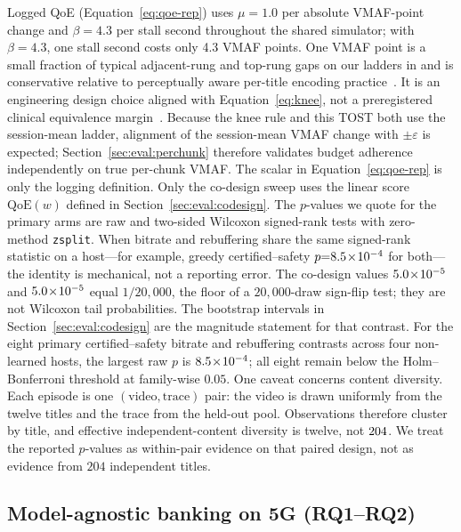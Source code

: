 Logged QoE (Equation~\eqref{eq:qoe-rep}) uses \(\mu{=}1.0\) per absolute VMAF-point change and \(\beta{=}4.3\) per stall second throughout the shared simulator; with \(\beta{=}4.3\), one stall second costs only 4.3 VMAF points.
One VMAF point is a small fraction of typical adjacent-rung and top-rung gaps on our ladders in  and is conservative relative to perceptually aware per-title encoding practice~\cite{menon2022perceptual}. It is an engineering design choice aligned with Equation~\eqref{eq:knee}, not a preregistered clinical equivalence margin~\cite{lakens2017equivalence}. Because the knee rule and this TOST both use the session-mean ladder, alignment of the session-mean VMAF change with \(\pm\varepsilon\) is expected; Section~\ref{sec:eval:perchunk} therefore validates budget adherence independently on true per-chunk VMAF.
The scalar in Equation~\eqref{eq:qoe-rep} is only the logging definition. Only the co-design sweep uses the linear score \(\mathrm{QoE}(w)\) defined in Section~\ref{sec:eval:codesign}.
The \(p\)-values we quote for the primary arms are raw and two-sided Wilcoxon signed-rank tests with zero-method \texttt{zsplit}.
When bitrate and rebuffering share the same signed-rank statistic on a host---for example, greedy certified--safety \(p{=}8.5\!\times\!10^{-4}\) for both---the identity is mechanical, not a reporting error.
The co-design values \(5.0\!\times\!10^{-5}\) and \(5.0\!\times\!10^{-5}\) equal \(1/20{,}000\), the floor of a \(20{,}000\)-draw sign-flip test; they are not Wilcoxon tail probabilities.
The bootstrap intervals in Section~\ref{sec:eval:codesign} are the magnitude statement for that contrast.
For the eight primary certified--safety bitrate and rebuffering contrasts across four non-learned hosts, the largest raw \(p\) is \(8.5\!\times\!10^{-4}\); all eight remain below the Holm--Bonferroni threshold at family-wise \(0.05\).
One caveat concerns content diversity. Each episode is one \((\text{video},\text{trace})\) pair: the video is drawn uniformly from the twelve titles and the trace from the held-out pool. Observations therefore cluster by title, and effective independent-content diversity is twelve, not \(204\). We treat the reported \(p\)-values as within-pair evidence on that paired design, not as evidence from \(204\) independent titles.

\subsection{Model-agnostic banking on \mbox{5G} (RQ1--RQ2)}
\label{sec:eval:main}

